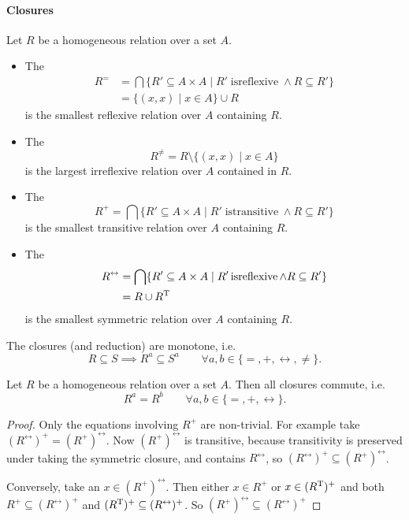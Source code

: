 \paragraph{Closures}
\begin{definition}
Let $R$ be a homogeneous relation over a set $A$.
\begin{itemize}
\item The 
\begin{align*}
R^= &= \bigcap\{ R'\subseteq A\times A\;|\; R'\operatorname{is reflexive} \land R\subseteq R' \}\\
&= \{ (x,x)\;|\; x\in A \}\cup R
\end{align*}
is the smallest reflexive relation over $A$ containing $R$.
\item The 
\[ R^{\neq} = R\setminus \{(x,x)\;|\; x \in A\} \]
is the largest irreflexive relation over $A$ contained in $R$.
\item The 
\[ R^+ = \bigcap\{ R'\subseteq A\times A\;|\; R'\operatorname{is transitive} \land R\subseteq R' \} \]
is the smallest transitive relation over $A$ containing $R$.
\item The 
\begin{align*}
R^\leftrightarrow &= \bigcap\{ R'\subseteq A\times A\;|\; R'\operatorname{is reflexive} \land R\subseteq R' \} \\
&=  R\cup R^{\mathrm{T}}
\end{align*}
is the smallest symmetric relation over $A$ containing $R$.
\end{itemize}
\end{definition}

\begin{lemma}
The closures (and reduction) are monotone, i.e.
\[ R\subseteq S \implies R^a\subseteq S^a \qquad \forall a,b\in\{=,+,\leftrightarrow,\neq\}. \]
\end{lemma}

\begin{lemma}
Let $R$ be a homogeneous relation over a set $A$. Then all closures commute, i.e.
\[ R^a = R^b \qquad \forall a,b\in\{=,+,\leftrightarrow\}. \]
\end{lemma}
\begin{proof}
Only the equations involving $R^+$ are non-trivial. For example take $(R^\leftrightarrow)^+ = (R^+)^\leftrightarrow$. Now $(R^+)^\leftrightarrow$ is transitive, because transitivity is preserved under taking the symmetric closure, and contains $R^\leftrightarrow$, so $(R^\leftrightarrow)^+ \subseteq (R^+)^\leftrightarrow$.

Conversely, take an $x\in (R^+)^\leftrightarrow$. Then either $x\in R^+$ or $x\in (R^{\mathrm{T}})^+$ and both $R^+\subseteq (R^\leftrightarrow)^+$ and $(R^{\mathrm{T}})^+\subseteq (R^\leftrightarrow)^+$. So $(R^+)^\leftrightarrow \subseteq (R^\leftrightarrow)^+$
\end{proof}

